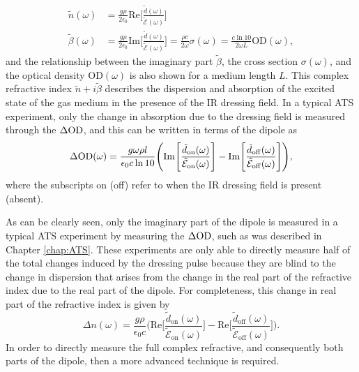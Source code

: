 \begin{equation}
	\begin{aligned}
		\tilde{n}(\omega) &= \frac{g \rho}{2 \epsilon_0} \mathrm{Re}\Bigg[ \frac{\tilde{d}(\omega)}{\tilde{\mathcal{E}}(\omega)} \Bigg]\\
		\tilde{\beta}(\omega) &= \frac{g \rho}{2\epsilon_0} \mathrm{Im}\Bigg[ \frac{\tilde{d}(\omega)}{\tilde{\mathcal{E}}(\omega)} \Bigg] = \frac{\rho c}{2\omega}\sigma(\omega) = \frac{c \ln 10}{2\omega L} \mathrm{OD}(\omega),
	\end{aligned}
\end{equation}
and the relationship between the imaginary part $\tilde{\beta}$, the cross section $\sigma(\omega)$, and the optical density $\mathrm{OD}(\omega)$ is also shown for a medium length $L$.  This complex refractive index $\tilde{n} + i\tilde{\beta}$ describes the dispersion and absorption of the excited state of the gas medium in the presence of the IR dressing field.  In a typical ATS experiment, only the change in absorption due to the dressing field is measured through the $\Delta\mathrm{OD}$, and this can be written in terms of the dipole as 
\begin{equation}
	\label{eqn:dod_im_dipole}
	\Delta\mathrm{OD}(\omega) = \frac{g \omega \rho l}{\epsilon_0 c \ln 10}\Bigg( \mathrm{Im}\Bigg[\frac{\tilde{d}_{\mathrm{on}}(\omega)}{\tilde{\mathcal{E}}_{\mathrm{on}}(\omega)}\Bigg] - \mathrm{Im}\Bigg[\frac{\tilde{d}_{\mathrm{off}}(\omega)}{\tilde{\mathcal{E}}_{\mathrm{off}}(\omega)}\Bigg] \Bigg),
\end{equation}
where the subscripts on (off) refer to when the IR dressing field is present (absent).

As can be clearly seen, only the imaginary part of the dipole is measured in a typical ATS experiment by measuring the $\Delta\mathrm{OD}$, such as was described in Chapter \ref{chap:ATS}.  These experiments are only able to directly measure half of the total changes induced by the dressing pulse because they are blind to the change in dispersion that arises from the change in the real part of the refractive index due to the real part of the dipole.  For completeness, this change in real part of the refractive index is given by 
\begin{equation}
	\label{eqn:dn_re_dipole}
	\Delta n(\omega) = \frac{g\rho}{\epsilon_0 c} \Bigg( \mathrm{Re}\Bigg[\frac{\tilde{d}_{\mathrm{on}}(\omega)}{\tilde{\mathcal{E}}_{\mathrm{on}}(\omega)}\Bigg] - \mathrm{Re}\Bigg[\frac{\tilde{d}_{\mathrm{off}}(\omega)}{\tilde{\mathcal{E}}_{\mathrm{off}}(\omega)}\Bigg] 
	\Bigg).
\end{equation}
In order to directly measure the full complex refractive, and consequently both parts of the dipole, then a more advanced technique is required. 



